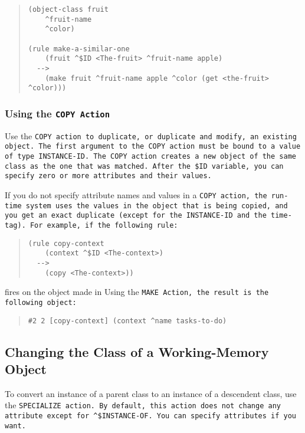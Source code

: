 \begin{quote}
\begin{verbatim}
(object-class fruit
    ^fruit-name
    ^color)

(rule make-a-similar-one
    (fruit ^$ID <The-fruit> ^fruit-name apple)
  -->
    (make fruit ^fruit-name apple ^color (get <the-fruit> ^color)))
\end{verbatim}
\end{quote}

\subsubsection*{Using the \tt{COPY} Action}

Use the \tt{COPY} action to duplicate, or duplicate and modify, an
existing object. The first argument to the \tt{COPY} action must be
bound to a value of type \tt{INSTANCE-ID}. The \tt{COPY} action
creates a new object of the same class as the one that was
matched. After the
\verb|$ID| variable, you can specify zero or more attributes and their
values.

If you do not specify attribute names and values in a \tt{COPY}
action, the run-time system uses the values in the object that is
being copied, and you get an exact duplicate (except for the
\tt{INSTANCE-ID} and the time-tag). For example, if the following
rule:

\begin{quote}
\begin{verbatim}
(rule copy-context
    (context ^$ID <The-context>)
  -->
    (copy <The-context>))
\end{verbatim}
\end{quote}

fires on the object made in Using the \tt{MAKE} Action, the result is
the following object:

\begin{quote}
\begin{verbatim}
#2 2 [copy-context] (context ^name tasks-to-do)
\end{verbatim}
\end{quote}

\subsection{Changing the Class of a Working-Memory Object}

To convert an instance of a parent class to an instance of a
descendent class, use the \tt{SPECIALIZE} action. By default, this
action does not change any attribute except for
\verb|^$INSTANCE-OF|. You can specify attributes if you want.

